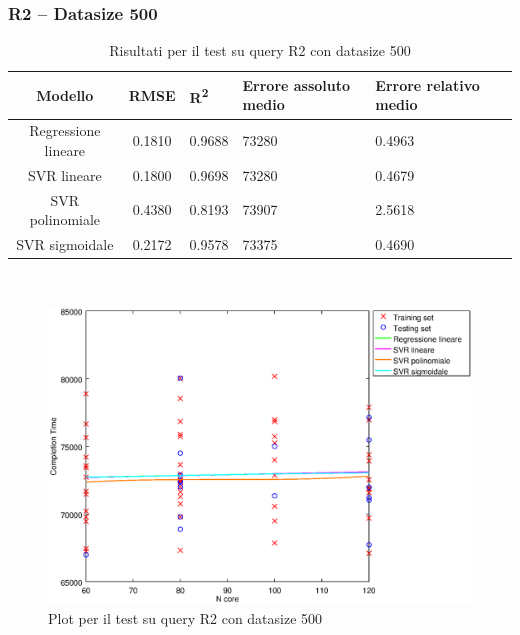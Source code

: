 \documentclass[a4paper,11pt]{article}
\begin{document}
\subsubsection{R2 -- Datasize 500}
\begin{table}[bhpt]
	\centering
	\begin{adjustbox}{center}
		\begin{tabular}{c | c M{1.2cm} M{2.5cm} M{2.5cm} M{1.8cm}}
			Modello & RMSE & R\textsuperscript{2} & Errore assoluto medio & Errore relativo medio \tabularnewline
			\hline
			Regressione lineare & 0.1810 & 0.9688 &  73280 & 0.4963 \\
			SVR lineare & 0.1800 & 0.9698 &  73280 & 0.4679 \\
			SVR polinomiale & 0.4380 & 0.8193 &  73907 & 2.5618 \\
			SVR sigmoidale & 0.2172 & 0.9578 &  73375 & 0.4690 \\
		\end{tabular}
	\end{adjustbox}
	\\
	\caption{Risultati per il test su query R2 con datasize 500}
	\label{table_R2_500}
\end{table}

\begin {figure}[hbtp]
\centering
\includegraphics[width=\textwidth]{output/R2_500/plot_R2_500.eps}
\caption {Plot per il test su query R2 con datasize 500}
\end {figure}
\newpage
\end{document}
